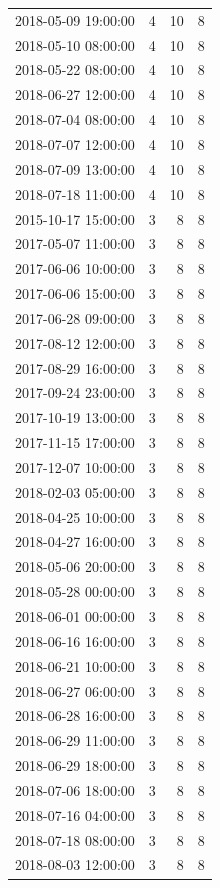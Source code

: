 \begin{tabular}{lrrr}
2018-05-09 19:00:00 & 4 & 10 & 8 \\
2018-05-10 08:00:00 & 4 & 10 & 8 \\
2018-05-22 08:00:00 & 4 & 10 & 8 \\
2018-06-27 12:00:00 & 4 & 10 & 8 \\
2018-07-04 08:00:00 & 4 & 10 & 8 \\
2018-07-07 12:00:00 & 4 & 10 & 8 \\
2018-07-09 13:00:00 & 4 & 10 & 8 \\
2018-07-18 11:00:00 & 4 & 10 & 8 \\
2015-10-17 15:00:00 & 3 & 8 & 8 \\
2017-05-07 11:00:00 & 3 & 8 & 8 \\
2017-06-06 10:00:00 & 3 & 8 & 8 \\
2017-06-06 15:00:00 & 3 & 8 & 8 \\
2017-06-28 09:00:00 & 3 & 8 & 8 \\
2017-08-12 12:00:00 & 3 & 8 & 8 \\
2017-08-29 16:00:00 & 3 & 8 & 8 \\
2017-09-24 23:00:00 & 3 & 8 & 8 \\
2017-10-19 13:00:00 & 3 & 8 & 8 \\
2017-11-15 17:00:00 & 3 & 8 & 8 \\
2017-12-07 10:00:00 & 3 & 8 & 8 \\
2018-02-03 05:00:00 & 3 & 8 & 8 \\
2018-04-25 10:00:00 & 3 & 8 & 8 \\
2018-04-27 16:00:00 & 3 & 8 & 8 \\
2018-05-06 20:00:00 & 3 & 8 & 8 \\
2018-05-28 00:00:00 & 3 & 8 & 8 \\
2018-06-01 00:00:00 & 3 & 8 & 8 \\
2018-06-16 16:00:00 & 3 & 8 & 8 \\
2018-06-21 10:00:00 & 3 & 8 & 8 \\
2018-06-27 06:00:00 & 3 & 8 & 8 \\
2018-06-28 16:00:00 & 3 & 8 & 8 \\
2018-06-29 11:00:00 & 3 & 8 & 8 \\
2018-06-29 18:00:00 & 3 & 8 & 8 \\
2018-07-06 18:00:00 & 3 & 8 & 8 \\
2018-07-16 04:00:00 & 3 & 8 & 8 \\
2018-07-18 08:00:00 & 3 & 8 & 8 \\
2018-08-03 12:00:00 & 3 & 8 & 8 \\

\end{tabular}
